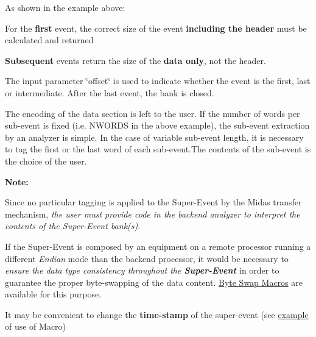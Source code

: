  \par


As shown in the example above: 
\begin{DoxyItemize}
\item For the {\bfseries first} event, the correct size of the event {\bfseries including the header} must be calculated and returned 
\item {\bfseries Subsequent} events return the size of the {\bfseries data only}, not the header. 
\end{DoxyItemize}

The input parameter \char`\"{}offset\char`\"{} is used to indicate whether the event is the first, last or intermediate. After the last event, the bank is closed. \par
 The encoding of the data section is left to the user. If the number of words per sub-\/event is fixed (i.e. NWORDS in the above example), the sub-\/event extraction by an analyzer is simple. In the case of variable sub-\/event length, it is necessary to tag the first or the last word of each sub-\/event.The contents of the sub-\/event is the choice of the user.

{\bfseries Note:} 
\begin{DoxyItemize}
\item Since no particular tagging is applied to the Super-\/Event by the Midas transfer mechanism, {\itshape  the user must provide code in the backend analyzer to interpret the contents of the Super-\/Event bank(s)\/}.
\end{DoxyItemize}


\begin{DoxyItemize}
\item If the Super-\/Event is composed by an equipment on a remote processor running a different {\itshape Endian\/} mode than the backend processor, it would be necessary to {\itshape ensure the data type consistency throughout the {\bfseries  Super-\/Event } \/} in order to guarantee the proper byte-\/swapping of the data content. \hyperlink{DataAnalysis_DA_Byte_Swap_Macros}{Byte Swap Macros} are available for this purpose.
\end{DoxyItemize}


\begin{DoxyItemize}
\item It may be convenient to change the {\bfseries time-\/stamp} of the super-\/event (see \hyperlink{FE_bank_construction_timestamp}{example} of use of Macro)
\end{DoxyItemize}


